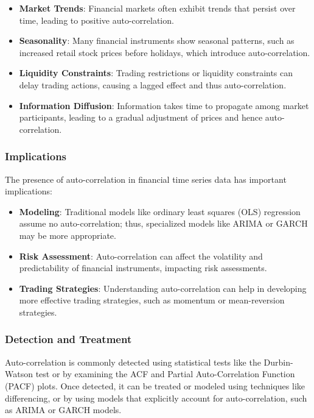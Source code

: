 \documentclass[12pt, twoside,hidelinks]{article}
\theoremstyle{definition}
\numberwithin{equation}{section}
\begin{document}
\begin{itemize}
    \item \textbf{Market Trends}: Financial markets often exhibit trends that persist over time, leading to positive auto-correlation.
    \item \textbf{Seasonality}: Many financial instruments show seasonal patterns, such as increased retail stock prices before holidays, which introduce auto-correlation.
    \item \textbf{Liquidity Constraints}: Trading restrictions or liquidity constraints can delay trading actions, causing a lagged effect and thus auto-correlation.
    \item \textbf{Information Diffusion}: Information takes time to propagate among market participants, leading to a gradual adjustment of prices and hence auto-correlation.
\end{itemize}

\subsubsection*{Implications}

The presence of auto-correlation in financial time series data has important implications:

\begin{itemize}
    \item \textbf{Modeling}: Traditional models like ordinary least squares (OLS) regression assume no auto-correlation; thus, specialized models like ARIMA or GARCH may be more appropriate.
    \item \textbf{Risk Assessment}: Auto-correlation can affect the volatility and predictability of financial instruments, impacting risk assessments.
    \item \textbf{Trading Strategies}: Understanding auto-correlation can help in developing more effective trading strategies, such as momentum or mean-reversion strategies.
\end{itemize}

\subsubsection*{Detection and Treatment}

Auto-correlation is commonly detected using statistical tests like the Durbin-Watson test or by examining the ACF and Partial Auto-Correlation Function (PACF) plots. Once detected, it can be treated or modeled using techniques like differencing, or by using models that explicitly account for auto-correlation, such as ARIMA or GARCH models.
\end{document}
